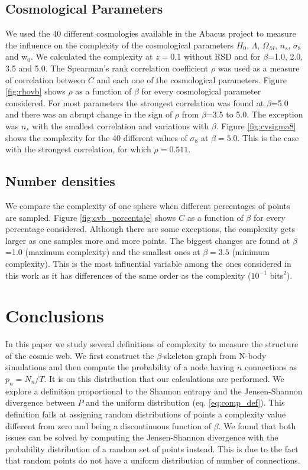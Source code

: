 \documentclass[fleqn,usenatbib]{mnras}
\begin{document}
\subsection{Cosmological Parameters}
We used the 40 different cosmologies available in the Abacus project
to measure the influence on the complexity of the cosmological
parameters $H_0$, $\Lambda$, $\Omega_{M}$, $n_s$, $\sigma_8$ and
w$_0$. We calculated the complexity at $z=0.1$ without RSD and for
$\beta$=1.0, 2.0, 3.5 and 5.0.  The Spearman’s rank correlation
coefficient $\rho$ was used as a measure of correlation between $C$
and each one of the cosmological parameters. Figure \ref{fig:rhovb}
shows $\rho$ as a function of $\beta$ for every cosmological parameter
considered.  For most parameters the strongest correlation was found
at $\beta$=5.0 and there was an abrupt change in the sign of $\rho$
from $\beta$=3.5 to 5.0. The exception was $n_{s}$ with the smallest
correlation and variations with $\beta$. Figure \ref{fig:cvsigma8}
shows the complexity for the 40 different values of $\sigma_{8}$ at
$\beta=5.0$. This is the case with the strongest correlation, for
which $\rho=0.511$. 

\subsection{Number densities}
We compare the complexity of one sphere when different percentages of
points are sampled. Figure \ref{fig:cvb_porcentaje} shows $C$ as a
function of $\beta$ for every percentage considered. Although there
are some exceptions, the complexity gets larger as one samples more
and more points. The biggest changes are found at $\beta$=1.0 (maximum
complexity) and the smallest ones at $\beta=3.5$ (minimum
complexity). This is the most influential variable among the ones
considered in this work as it has differences of the same order as the
complexity ($10^{-1}$ bits$^2$). 






\section{Conclusions}

In this paper we study several definitions of complexity to measure the structure of the cosmic web. We first construct the $\beta$-skeleton graph from N-body simulations and then compute the probability of a node having $n$ connections as $p_{n}=N_{n}/T$. It is on this distribution that our calculations are performed. We explore a definition proportional to the Shannon entropy and the Jensen-Shannon divergence between $P$ and the uniform distribution (eq. \ref{eq:comp_def}). This definition fails at assigning random distributions of points a complexity value different from zero and being a discontinuous function of $\beta$. We found that both issues can be solved by computing the Jensen-Shannon divergence with the probability distribution of a random set of points instead. This is due to the fact that random points do not have a uniform distribution of number of connections. 
\end{document}
